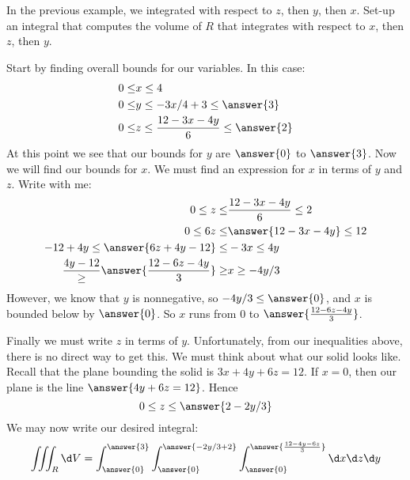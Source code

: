 \documentclass{ximera}
\begin{document}
\begin{question}
  In the previous example, we integrated with respect to $z$, then
  $y$, then $x$. Set-up an integral that computes the volume of $R$
  that integrates with respect to $x$, then $z$, then $y$.
  \begin{prompt}
    Start by finding overall bounds for our variables. In this case:
    \begin{align*}
      0\le &x \le 4\\
      0\le &y \le -3x/4+3 \le \answer{3}\\
      0\le &z \le \frac{12-3x-4y}{6}\le \answer{2}
    \end{align*}
    At this point we see that our bounds for $y$ are $\answer{0}$ to
    $\answer{3}$. Now we will find our bounds for $x$. We must find an
    expression for $x$ in terms of $y$ and $z$. Write with me:
    \begin{align*}
      0\le z \le &\frac{12-3x-4y}{6}\le 2\\
      0\le 6z \le &\answer{12-3x-4y} \le 12\\
      -12+4y\le \answer{6z+4y-12}\le &-3x \le 4y\\
      \frac{4y-12}\ge \answer{\frac{12-6z-4y}{3}}\ge &x \ge -4y/3
    \end{align*}
    However, we know that $y$ is nonnegative, so $-4y/3\le \answer{0}$, and $x$
    is bounded below by $\answer{0}$. So $x$ runs from $0$ to
    $\answer{\frac{12-6z-4y}{3}}$.

    Finally we must write $z$ in terms of $y$. Unfortunately, from our
    inequalities above, there is no direct way to get this. We must
    think about what our solid looks like. Recall that the plane
    bounding the solid is $3x + 4y + 6z = 12$. If $x=0$, then our
    plane is the line $\answer{4y+6z=12}$. Hence
    \[
    0\le z \le \answer{2-2y/3}
    \]
    We may now write our desired integral:
    \[
    \iiint_R \d V = \int_{\answer{0}}^{\answer{3}}\int_{\answer{0}}^{\answer{-2y/3+2}} \int_{\answer{0}}^{\answer{\frac{12-4y-6z}{3}}} \d x \d z \d y
    \]
  \end{prompt}
\end{question}
\end{document}

